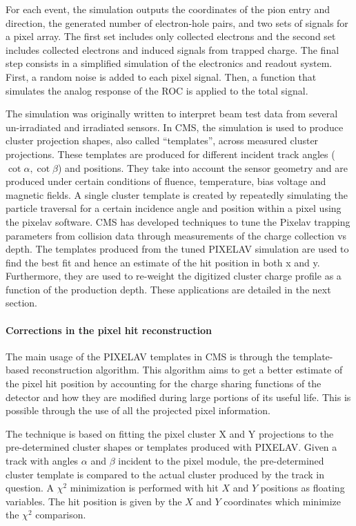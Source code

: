 For each event, the simulation outputs the coordinates of the pion entry and direction, the generated number of electron-hole pairs, and two sets of signals for a pixel array.
The first set includes only collected electrons and the second set includes collected electrons and induced signals from trapped charge.
The final step consists in a simplified simulation of the electronics and readout system.
First, a random noise is added to each pixel signal.
Then, a function that simulates the analog response of the ROC is applied to the total signal.

The simulation was originally written to interpret beam test data from several un-irradiated and irradiated sensors. 
In CMS, the simulation is used to produce cluster projection shapes, also called ``templates'', across measured cluster projections. 
These templates are produced for different incident track angles ($\cot \alpha, \cot \beta$) and positions. 
They take into account the sensor geometry and are produced under certain conditions of fluence, temperature, bias voltage and magnetic fields.
A single cluster template is created by repeatedly simulating the particle traversal for a certain incidence angle and position within a pixel using the pixelav software.
CMS has developed techniques to tune the Pixelav trapping parameters from collision data through measurements of the charge collection vs depth.
The templates produced from the tuned PIXELAV simulation are used to find the best fit and hence an estimate of the hit position in both x and y. 
Furthermore, they are used to re-weight the digitized cluster charge profile as a function of the production depth.
These applications are detailed in the next section.


\paragraph{Corrections in the pixel hit reconstruction}
The main usage of the PIXELAV templates in CMS is through the template-based reconstruction algorithm. This algorithm aims to get a better estimate of the pixel hit position by accounting for the charge sharing functions of the detector and how they are modified during large portions of its useful life. This is possible through the use of all the projected pixel information.

The technique is based on fitting the pixel cluster X and Y projections to the pre-determined cluster shapes or templates produced with PIXELAV. 
Given a track with angles $\alpha$ and $\beta$ incident to the pixel module, the pre-determined cluster template is compared to the actual cluster produced by the track in question. 
A $\chi^2$ minimization is performed with hit $X$ and $Y$ positions as floating variables.
The hit position is given by the $X$ and $Y$ coordinates which minimize the $\chi^2$ comparison.

